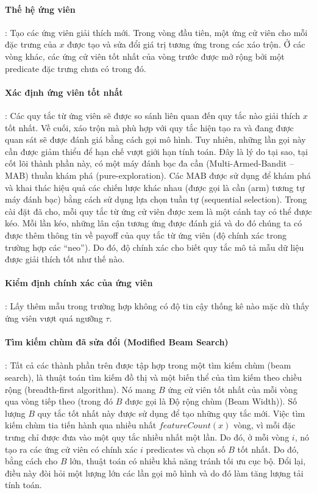 \paragraph{Thế hệ ứng viên}: Tạo các ứng viên giải thích mới. Trong vòng đầu tiên, một ứng cử viên cho mỗi đặc trưng của $x$ được tạo và sửa đổi giá trị tương ứng trong các xáo trộn. Ở các vòng khác, các ứng cử viên tốt nhất của vòng trước được mở rộng bởi một predicate đặc trưng chưa có trong đó.
\paragraph{Xác định ứng viên tốt nhất}: Các quy tắc từ ứng viên sẽ được so sánh liên quan đến quy tắc nào giải thích $x$ tốt nhất. Về cuối, xáo trộn mà phù hợp với quy tắc hiện tạo ra và đang được quan sát sẽ được đánh giá bằng cách gọi mô hình. Tuy nhiên, những lần gọi này cần được giảm thiểu để hạn chế vượt giới hạn tính toán. Đây là lý do tại sao, tại cốt lõi thành phần này, có một máy đánh bạc đa cần (Multi-Armed-Bandit -- MAB) thuần khám phá (pure-exploration). Các MAB được sử dụng để khám phá và khai thác hiệu quả các chiến lược khác nhau (được gọi là cần (arm) tương tự máy đánh bạc) bằng cách sử dụng lựa chọn tuần tự (sequential selection). Trong cài đặt đã cho, mỗi quy tắc từ ứng cử viên được xem là một cánh tay có thể được kéo. Mỗi lần kéo, những lân cận tương ứng được đánh giá và do đó chúng ta có được thêm thông tin về payoff của quy tắc từ ứng viên (độ chính xác trong trường hợp các “neo”). Do đó, độ chính xác cho biết quy tắc mô tả mẫu dữ liệu được giải thích tốt như thế nào.

\paragraph{Kiểm định chính xác của ứng viên}: Lấy thêm mẫu trong trường hợp không có độ tin cậy thống kê nào mặc dù thấy ứng viên vượt quá ngưỡng $\tau$.

\paragraph{Tìm kiếm chùm đã sửa đổi (Modified Beam Search)}: Tất cả các thành phần trên được tập hợp trong một tìm kiếm chùm (beam search), là thuật toán tìm kiếm đồ thị và một biến thể của tìm kiếm theo chiều rộng (breadth-first algorithm). Nó mang $B$ ứng cử viên tốt nhất của mỗi vòng qua vòng tiếp theo (trong đó $B$ được gọi là Độ rộng chùm (Beam Width)). Số lượng $ B $ quy tắc tốt nhất này được sử dụng để tạo những quy tắc mới. Việc tìm kiếm chùm tia tiến hành qua nhiều nhất $featureCount(x)$ vòng, vì mỗi đặc trưng chỉ được đưa vào một quy tắc nhiều nhất một lần. Do đó, ở mỗi vòng $i$, nó tạo ra các ứng cử viên có chính xác $i$ predicates và chọn số $B$ tốt nhất. Do đó, bằng cách cho $B$ lớn, thuật toán có nhiều khả năng tránh tối ưu cục bộ. Đổi lại, điều này đòi hỏi một lượng lớn các lần gọi mô hình và do đó làm tăng lượng tải tính toán.

